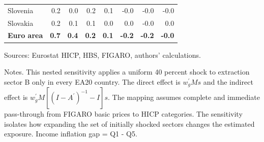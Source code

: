 \documentclass[11pt]{article}
\begin{document}
\begin{table}[H]
\begin{tabular}{lrrrrrrr}
 \\
Slovenia & 0.2 & 0.0 & 0.2 & 0.1 & -0.0 & -0.0 & -0.0
 \\
Slovakia & 0.2 & 0.1 & 0.1 & 0.0 & 0.0 & -0.0 & 0.0
 \\
\midrule
\textbf{Euro area} & \textbf{0.7} & \textbf{0.4} & \textbf{0.2} & \textbf{0.1} & \textbf{-0.2} & \textbf{-0.2} & \textbf{-0.0}
 \\
\bottomrule
\end{tabular}
\par\vspace{0.35em}\footnotesize\noindent Sources: Eurostat HICP, HBS, FIGARO, authors' calculations.
\par\vspace{0.25em}\footnotesize\noindent Notes. This nested sensitivity applies a uniform 40 percent shock to extraction sector B only in every EA20 country. The direct effect is $w_g^{\prime}Ms$ and the indirect effect is $w_g^{\prime}M[(I-A^{\prime})^{-1}-I]s$. The mapping assumes complete and immediate pass-through from FIGARO basic prices to HICP categories. The sensitivity isolates how expanding the set of initially shocked sectors changes the estimated exposure. Income inflation gap = Q1 - Q5.
\end{table}
\vspace{0.6em}
\end{document}

